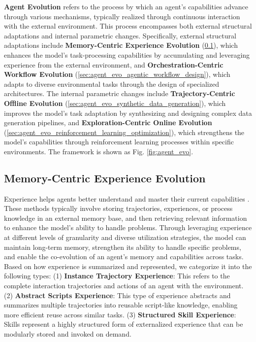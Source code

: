 \documentclass{llmxive}
\begin{document}
\textbf{Agent Evolution} refers to the process by which an agent’s capabilities advance through various mechanisms, typically realized through continuous interaction with the external environment. This process encompasses both external structural adaptations and internal parametric changes. Specifically, external structural adaptations include \textbf{Memory-Centric Experience Evolution} (\cref{sec:agent_evo_experience_utilization}), which enhances the model's task-processing capabilities by accumulating and leveraging experience from the external environment, and \textbf{Orchestration-Centric Workflow Evolution} (\cref{sec:agent_evo_agentic_workflow_design}), which adapts to diverse environmental tasks through the design of specialized architectures. The internal parametric changes include \textbf{Trajectory-Centric Offline Evolution} (\cref{sec:agent_evo_synthetic_data_generation}), which improves the model’s task adaptation by synthesizing and designing complex data generation pipelines, and \textbf{Exploration-Centric Online Evolution} (\cref{sec:agent_evo_reinforcement_learning_optimization}), which strengthens the model's capabilities through reinforcement learning processes within specific environments. The framework is shown as Fig. \ref{fig:agent_evo}.

\subsection{Memory-Centric Experience Evolution}
\label{sec:agent_evo_experience_utilization}
Experience helps agents better understand and master their current capabilities \cite{survey_Memory_in, survey_Rethinking_Memory_in, survey_Rethinking_Memory,Think_While_Watching,Learning_How_to_Remember}. These methods typically involve storing trajectories, experiences, or process knowledge in an external memory base, and then retrieving relevant information to enhance the model’s ability to handle problems. Through leveraging experience at different levels of granularity and diverse utilization strategies, the model can maintain long-term memory, strengthen its ability to handle specific problems, and enable the co-evolution of an agent’s memory and capabilities across tasks. Based on how experience is summarized and represented, we categorize it into the following types: (1) \textbf{Instance Trajectory Experience}: This refers to the complete interaction trajectories and actions of an agent with the environment. (2) \textbf{Abstract Scripts Experience}: This type of experience abstracts and summarizes multiple trajectories into reusable script-like knowledge, enabling more efficient reuse across similar tasks. (3) \textbf{Structured Skill Experience}: Skills represent a highly structured form of externalized experience that can be modularly stored and invoked on demand.
\end{document}
